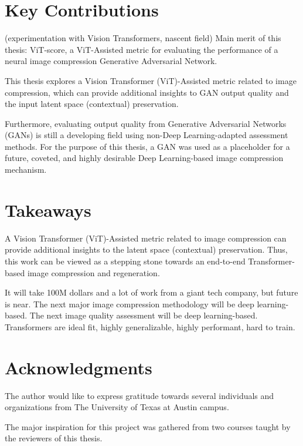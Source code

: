 \section{Key Contributions}

(experimentation with Vision Transformers, nascent field)
Main merit of this thesis:
ViT-score, a ViT-Assisted metric for evaluating the performance of a neural image compression
Generative Adversarial Network.

This thesis explores a Vision Transformer (ViT)-Assisted metric related to 
image compression, which can provide 
additional insights to GAN output quality and the input latent space (contextual) preservation.

Furthermore, evaluating output quality from Generative Adversarial Networks (GANs) is 
still a developing field using non-Deep Learning-adapted assessment methods. 
For the purpose of this thesis, a GAN was used as a placeholder 
for a future, coveted, and highly desirable Deep Learning-based image compression mechanism. 


\section{Takeaways}

A Vision Transformer (ViT)-Assisted metric related to image compression can provide 
additional insights to the latent space (contextual) preservation.
Thus, this work can be viewed as a stepping stone towards an end-to-end Transformer-based
image compression and regeneration.

It will take 100M dollars and a lot of work from a giant tech company, but
future is near. The next major image compression methodology will be deep learning-based.
The next image quality assessment will be deep learning-based.
Transformers are ideal fit, highly generalizable, highly performant, hard to train.


\section{Acknowledgments}

The author would like to express gratitude towards several individuals and organizations
from The University of Texas at Austin campus.


The major inspiration for this project was gathered from two courses taught by the
reviewers of this thesis.


